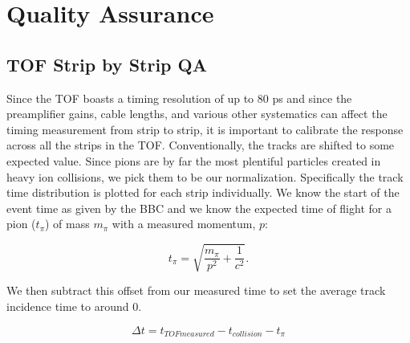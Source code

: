\section{Quality Assurance}
\subsection{TOF Strip by Strip QA}
Since the TOF boasts a timing resolution of up to 80 ps and since the preamplifier gains, cable lengths, and various other systematics can affect the timing measurement from strip to strip, it is important to calibrate the response across all the strips in the TOF. Conventionally, the tracks are shifted to some expected value. Since pions are by far the most plentiful particles created in heavy ion collisions, we pick them to be our normalization. Specifically the track time distribution is plotted for each strip individually. We know the start of the event time as given by the BBC and we know the expected time of flight for a pion ($t_{\pi}$) of mass $m_{\pi}$ with a measured momentum, $p$:

\begin{equation}
t_{\pi} = \sqrt{\frac{m_{\pi}}{p^2} + \frac{1}{c^2}}.
\end{equation}

We then subtract this offset from our measured time to set the average track incidence time to around 0.

\begin{equation}
\Delta t = t_{TOF measured} - t_{collision} - t_{\pi} 
\end{equation}

